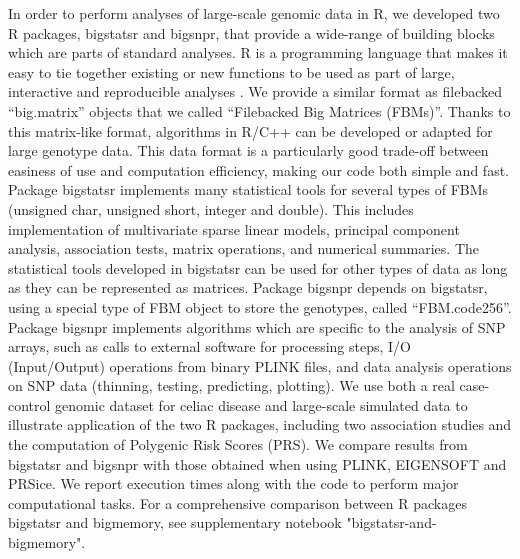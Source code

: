 \documentclass{bioinfo}
\begin{document}
{\color{red}
In order to perform analyses of large-scale genomic data in R, we developed two R packages, bigstatsr and bigsnpr, that provide a wide-range of building blocks which are parts of standard analyses. 
R is a programming language that makes it easy to tie together existing or new functions to be used as part of large, interactive and reproducible analyses \cite[]{R2017}.
We provide a similar format as filebacked ``big.matrix'' objects that we called ``Filebacked Big Matrices (FBMs)''. Thanks to this matrix-like format, algorithms in R/C++ can be developed or adapted for large genotype data. This data format is a particularly good trade-off between easiness of use and computation efficiency, making our code both simple and fast.
}
Package bigstatsr implements many statistical tools for several types of FBMs (unsigned char, unsigned short, integer and double). This includes implementation of multivariate sparse linear models, principal component analysis, association tests, matrix operations, and numerical summaries. The statistical tools developed in bigstatsr can be used for other types of data as long as they can be represented as matrices. Package bigsnpr depends on bigstatsr, using a special type of FBM object to store the genotypes, called ``FBM.code256''. Package bigsnpr implements algorithms which are specific to the analysis of SNP arrays, such as calls to external software for processing steps, I/O (Input/Output) operations from binary PLINK files, and data analysis operations on SNP data (thinning, testing, predicting, plotting). 
We use both a real case-control genomic dataset for celiac disease and large-scale simulated data to illustrate application of the two R packages, including two association studies and the computation of Polygenic Risk Scores (PRS). We compare results from bigstatsr and bigsnpr with those obtained when using PLINK, EIGENSOFT and PRSice. We report execution times along with the code to perform major computational tasks. 
{\color{red}
For a comprehensive comparison between R packages bigstatsr and bigmemory, see supplementary notebook "bigstatsr-and-bigmemory".
} 
\end{document}
